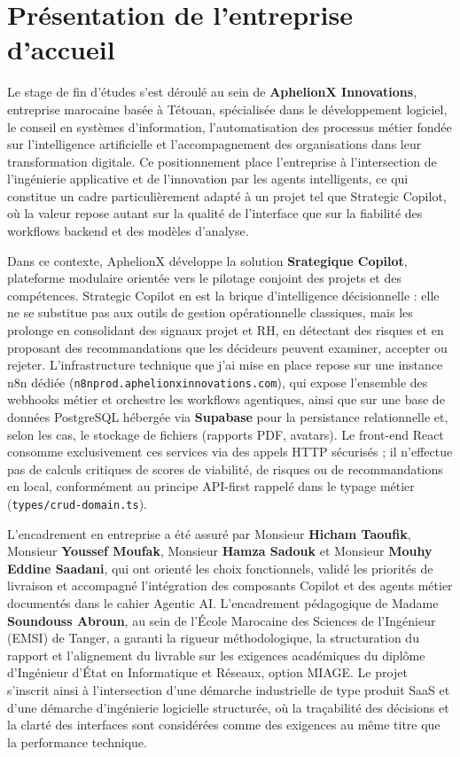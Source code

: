 \section{Présentation de l'entreprise d'accueil}

Le stage de fin d'études s'est déroulé au sein de \textbf{AphelionX Innovations}, entreprise marocaine basée à Tétouan, spécialisée dans le développement logiciel, le conseil en systèmes d'information, l'automatisation des processus métier fondée sur l'intelligence artificielle et l'accompagnement des organisations dans leur transformation digitale. Ce positionnement place l'entreprise à l'intersection de l'ingénierie applicative et de l'innovation par les agents intelligents, ce qui constitue un cadre particulièrement adapté à un projet tel que Strategic Copilot, où la valeur repose autant sur la qualité de l'interface que sur la fiabilité des workflows backend et des modèles d'analyse.

Dans ce contexte, AphelionX développe la solution \textbf{Srategique Copilot}, plateforme modulaire orientée vers le pilotage conjoint des projets et des compétences. Strategic Copilot en est la brique d'intelligence décisionnelle : elle ne se substitue pas aux outils de gestion opérationnelle classiques, mais les prolonge en consolidant des signaux projet et RH, en détectant des risques et en proposant des recommandations que les décideurs peuvent examiner, accepter ou rejeter. L'infrastructure technique que j'ai mise en place repose sur une instance n8n dédiée (\texttt{n8nprod.aphelionxinnovations.com}), qui expose l'ensemble des webhooks métier et orchestre les workflows agentiques, ainsi que sur une base de données PostgreSQL hébergée via \textbf{Supabase} pour la persistance relationnelle et, selon les cas, le stockage de fichiers (rapports PDF, avatars). Le front-end React consomme exclusivement ces services via des appels HTTP sécurisés ; il n'effectue pas de calculs critiques de scores de viabilité, de risques ou de recommandations en local, conformément au principe API-first rappelé dans le typage métier (\texttt{types/crud-domain.ts}).

L'encadrement en entreprise a été assuré par Monsieur \textbf{Hicham Taoufik}, Monsieur \textbf{Youssef Moufak}, Monsieur \textbf{Hamza Sadouk} et Monsieur \textbf{Mouhy Eddine Saadani}, qui ont orienté les choix fonctionnels, validé les priorités de livraison et accompagné l'intégration des composants Copilot et des agents métier documentés dans le cahier Agentic AI. L'encadrement pédagogique de Madame \textbf{Soundouss Abroun}, au sein de l'École Marocaine des Sciences de l'Ingénieur (EMSI) de Tanger, a garanti la rigueur méthodologique, la structuration du rapport et l'alignement du livrable sur les exigences académiques du diplôme d'Ingénieur d'État en Informatique et Réseaux, option MIAGE. Le projet s'inscrit ainsi à l'intersection d'une démarche industrielle de type produit SaaS et d'une démarche d'ingénierie logicielle structurée, où la traçabilité des décisions et la clarté des interfaces sont considérées comme des exigences au même titre que la performance technique.

